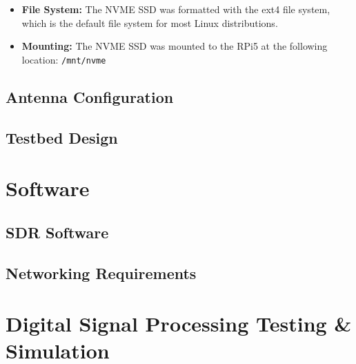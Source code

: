 \begin{itemize}
    \item \textbf{File System:} The NVME SSD was formatted with the ext4 file system, which is the default file system for most Linux distributions. 
    \item \textbf{Mounting:} The NVME SSD was mounted to the RPi5 at the following location: \texttt{/mnt/nvme}
\end{itemize}


\subsection{Antenna Configuration \label{sec:antenna}}
\subsection{Testbed Design \label{sec:testbed}}


\section{Software}
\subsection{SDR Software \label{sec:SDRsoftware}}
\subsection{Networking Requirements \label{sec:networking}}


\section{Digital Signal Processing Testing \& Simulation}



